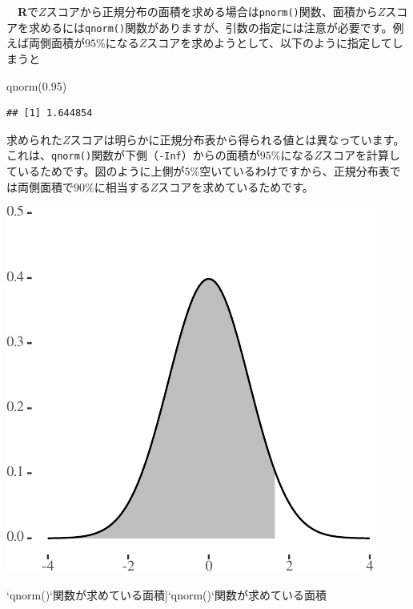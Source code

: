 \documentclass[]{tufte-handout}
\newenvironment{Shaded}{}{}
\newcommand{\FloatTok}[1]{\textcolor[rgb]{0.25,0.63,0.44}{#1}}
\newcommand{\FunctionTok}[1]{\textcolor[rgb]{0.02,0.16,0.49}{#1}}
\newcommand{\NormalTok}[1]{#1}
\begin{document}
　\textbf{R}で\(Z\)スコアから正規分布の面積を求める場合は\texttt{pnorm()}関数、面積から\(Z\)スコアを求めるには\texttt{qnorm()}関数がありますが、引数の指定には注意が必要です。例えば両側面積が\(95\%\)になる\(Z\)スコアを求めようとして、以下のように指定してしまうと

\begin{Shaded}
\begin{Highlighting}[numbers=left,,]
\FunctionTok{qnorm}\NormalTok{(}\FloatTok{0.95}\NormalTok{)}
\end{Highlighting}
\end{Shaded}

\begin{verbatim}
## [1] 1.644854
\end{verbatim}

求められた\(Z\)スコアは明らかに正規分布表から得られる値とは異なっています。これは、\texttt{qnorm()}関数が下側（\texttt{-Inf}）からの面積が\(95\%\)になる\(Z\)スコアを計算しているためです。図のように上側が\(5\%\)空いているわけですから、正規分布表では両側面積で\(90\%\)に相当する\(Z\)スコアを求めているためです。

\begin{marginfigure}

{\centering \includegraphics{NormTable_files/figure-latex/unnamed-chunk-3-1} 

}

\caption[`qnorm()`関数が求めている面積]{`qnorm()`関数が求めている面積}\label{fig:unnamed-chunk-3}
\end{marginfigure}
\end{document}
